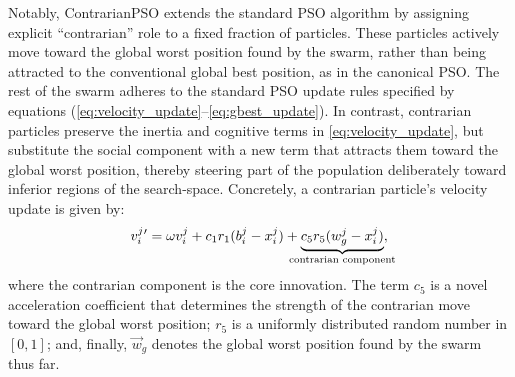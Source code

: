 {Notably, ContrarianPSO extends the standard PSO algorithm by assigning explicit ``contrarian'' role to a fixed fraction of particles. These particles actively move toward the global worst position found by the swarm, rather than being attracted to the conventional global best position, as in the canonical PSO.
The rest of the swarm adheres to the standard PSO update rules specified by equations (\ref{eq:velocity_update}–\ref{eq:gbest_update}). In contrast, contrarian particles preserve the inertia and cognitive terms in \eqref{eq:velocity_update}, but substitute the social component with a new term that attracts them toward the global worst position, thereby steering part of the population deliberately toward inferior regions of the \gls{search-space}.
Concretely, a contrarian particle's velocity update is given by:
\begin{equation}\label{eq:velocity_update_contrarian}
v_{i}^{j}{}'= \omega v_{i}^{j} +
c_1 r_1 (b_{i}^{j} - x_{i}^{j}) +
\underbrace{c_5 r_5 (w_{g}^{j} - x_{i}^{j})}_{\mathclap{\text{contrarian component}}},
\end{equation}
where the contrarian component is the core innovation. The term $c_5$ is a novel acceleration coefficient that determines the strength of the contrarian move toward the global worst position; $r_5$ is a uniformly distributed random number in $[0, 1]$; and, finally, $\vec{w}_g$ denotes the global worst position found by the swarm thus far.



\begin{figure}[H]
    \centering
\end{figure}}
